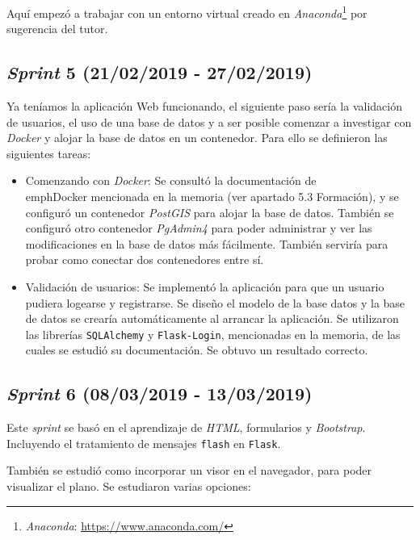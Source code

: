 Aquí empezó a trabajar con un entorno virtual creado en \emph{Anaconda}\footnote{\textsl{Anaconda}: \url{https://www.anaconda.com/}} por sugerencia del tutor.


\subsection{\emph{Sprint} 5 (21/02/2019 - 27/02/2019)}

Ya teníamos la aplicación Web funcionando, el siguiente paso sería la validación de usuarios, el uso de una base de datos y a ser posible comenzar a investigar con \emph{Docker} y alojar la base de datos en un contenedor. Para ello se definieron las siguientes tareas:

\begin{itemize}
\item Comenzando con \emph{Docker}: Se consultó la documentación de \\emph{Docker} mencionada en la memoria (ver apartado 5.3 Formación), y se configuró un contenedor \emph{PostGIS} para alojar la base de datos. También se configuró otro contenedor \emph{PgAdmin4} para poder administrar y ver las modificaciones en la base de datos más fácilmente. También serviría para probar como conectar dos contenedores entre sí.

\item Validación de usuarios: Se implementó la aplicación para que un usuario pudiera logearse y registrarse. Se diseño el modelo de la base datos y la base de datos se crearía automáticamente al arrancar la aplicación. Se utilizaron  las librerías \texttt{SQLAlchemy} y \texttt{Flask-Login}, mencionadas en la memoria, de las cuales se estudió su documentación. Se obtuvo un resultado correcto.
\end{itemize} 


\subsection{\emph{Sprint} 6 (08/03/2019 - 13/03/2019)}

Este \emph{sprint} se basó en el aprendizaje de \emph{HTML}, formularios y \emph{Bootstrap}. Incluyendo el tratamiento de mensajes \texttt{flash} en \texttt{Flask}.

También se estudió como incorporar un visor en el navegador, para poder visualizar el plano. Se estudiaron varias opciones:


